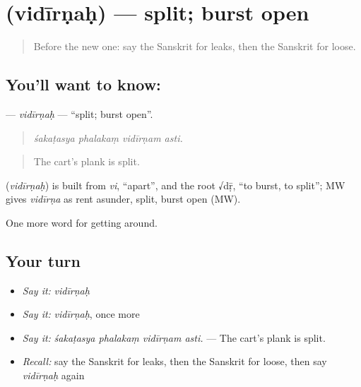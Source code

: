 \section[\texorpdfstring{\sk{विदीर्णः} (vidīrṇaḥ)}{विदीर्णः (vidīrṇaḥ)}]{ (vidīrṇaḥ) — split; burst open}

\label{lesson:SA-C410-vidirnah}



\begin{quote}
Before the new one: say the Sanskrit for leaks, then the Sanskrit for loose.
\end{quote}

\subsection*{You'll want to know: }
\textbf{} — \emph{vidīrṇaḥ} — \textquotedblleft{}split; burst open\textquotedblright{}.

\begin{quote}
   
\end{quote}

\begin{quote}
\emph{śakaṭasya phalakaṃ vidīrṇam asti.}
\end{quote}

\begin{quote}
The cart's plank is split.
\end{quote}

\begin{cousinweb}
\textbf{} (\emph{vidīrṇaḥ}) is built from \emph{vi}, \textquotedblleft{}apart\textquotedblright{}, and the root √dṝ, \textquotedblleft{}to burst, to split\textquotedblright{}; MW gives \emph{vidīrṇa} as rent asunder, split, burst open (MW).
\end{cousinweb}

\begin{grammarlens}[title={What you've built}]
One more word for getting around.
\end{grammarlens}

\subsection*{Your turn}
\begin{itemize}
\raggedright
  \item \emph{Say it:} \emph{vidīrṇaḥ}
  \item \emph{Say it:} \emph{vidīrṇaḥ}, once more
  \item \emph{Say it:} \emph{śakaṭasya phalakaṃ vidīrṇam asti.} — The cart's plank is split.
  \item \emph{Recall:} say the Sanskrit for leaks, then the Sanskrit for loose, then say \emph{vidīrṇaḥ} again
\end{itemize}

